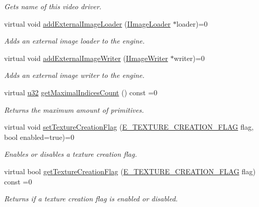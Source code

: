 \begin{DoxyCompactItemize}
\begin{DoxyCompactList}\small\item\em Gets name of this video driver. \end{DoxyCompactList}\item 
virtual void \hyperlink{classirr_1_1video_1_1IVideoDriver_a9479ae15f0e26eaaf15c9420ff289b6d}{add\+External\+Image\+Loader} (\hyperlink{classirr_1_1video_1_1IImageLoader}{I\+Image\+Loader} $\ast$loader)=0
\begin{DoxyCompactList}\small\item\em Adds an external image loader to the engine. \end{DoxyCompactList}\item 
virtual void \hyperlink{classirr_1_1video_1_1IVideoDriver_a56160e0d88346e04db921fbe4635a7ae}{add\+External\+Image\+Writer} (\hyperlink{classirr_1_1video_1_1IImageWriter}{I\+Image\+Writer} $\ast$writer)=0
\begin{DoxyCompactList}\small\item\em Adds an external image writer to the engine. \end{DoxyCompactList}\item 
virtual \hyperlink{namespaceirr_a0416a53257075833e7002efd0a18e804}{u32} \hyperlink{classirr_1_1video_1_1IVideoDriver_a834b7db981d14737c9162a4e3368eb03}{get\+Maximal\+Indices\+Count} () const  =0
\begin{DoxyCompactList}\small\item\em Returns the maximum amount of primitives. \end{DoxyCompactList}\item 
virtual void \hyperlink{classirr_1_1video_1_1IVideoDriver_a868b58a6b86b9e4841ca3879ce246c4e}{set\+Texture\+Creation\+Flag} (\hyperlink{namespaceirr_1_1video_acaf6f7414534f7d62bff18c5bf11876f}{E\+\_\+\+T\+E\+X\+T\+U\+R\+E\+\_\+\+C\+R\+E\+A\+T\+I\+O\+N\+\_\+\+F\+L\+AG} flag, bool enabled=true)=0
\begin{DoxyCompactList}\small\item\em Enables or disables a texture creation flag. \end{DoxyCompactList}\item 
virtual bool \hyperlink{classirr_1_1video_1_1IVideoDriver_a44621435e1e6b518fc833e6a3c68a837}{get\+Texture\+Creation\+Flag} (\hyperlink{namespaceirr_1_1video_acaf6f7414534f7d62bff18c5bf11876f}{E\+\_\+\+T\+E\+X\+T\+U\+R\+E\+\_\+\+C\+R\+E\+A\+T\+I\+O\+N\+\_\+\+F\+L\+AG} flag) const  =0
\begin{DoxyCompactList}\small\item\em Returns if a texture creation flag is enabled or disabled. \end{DoxyCompactList}\item 

\end{DoxyCompactItemize}
